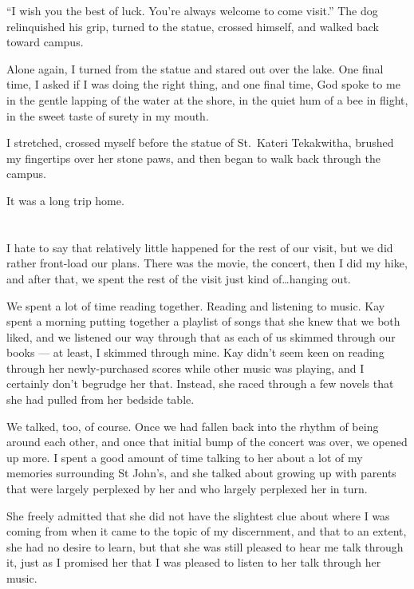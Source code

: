 ``I wish you the best of luck. You're always welcome to come visit.'' The dog relinquished his grip, turned to the statue, crossed himself, and walked back toward campus.

Alone again, I turned from the statue and stared out over the lake. One final time, I asked if I was doing the right thing, and one final time, God spoke to me in the gentle lapping of the water at the shore, in the quiet hum of a bee in flight, in the sweet taste of surety in my mouth.

I stretched, crossed myself before the statue of St.~Kateri Tekakwitha, brushed my fingertips over her stone paws, and then began to walk back through the campus.

It was a long trip home.

\section{}

I hate to say that relatively little happened for the rest of our visit, but we did rather front-load our plans. There was the movie, the concert, then I did my hike, and after that, we spent the rest of the visit just kind of\ldots hanging out.

We spent a lot of time reading together. Reading and listening to music. Kay spent a morning putting together a playlist of songs that she knew that we both liked, and we listened our way through that as each of us skimmed through our books --- at least, I skimmed through mine. Kay didn't seem keen on reading through her newly-purchased scores while other music was playing, and I certainly don't begrudge her that. Instead, she raced through a few novels that she had pulled from her bedside table.

We talked, too, of course. Once we had fallen back into the rhythm of being around each other, and once that initial bump of the concert was over, we opened up more. I spent a good amount of time talking to her about a lot of my memories surrounding St John's, and she talked about growing up with parents that were largely perplexed by her and who largely perplexed her in turn.

She freely admitted that she did not have the slightest clue about where I was coming from when it came to the topic of my discernment, and that to an extent, she had no desire to learn, but that she was still pleased to hear me talk through it, just as I promised her that I was pleased to listen to her talk through her music.


